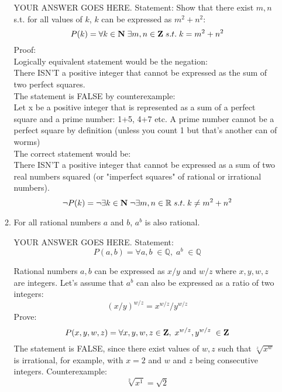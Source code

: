 \documentclass{article}
\begin{document}
\begin{enumerate}
\begin{enumerate}
YOUR ANSWER GOES HERE.
\newline \newline
Statement: 
Show that there exist $m,n$ s.t. for all values of $k$, $k$ can be expressed as $m^2+n^2$:
\[ P(k)= \forall k \in \mbox{{\bfseries N}} \; \exists m,n \in \mbox{{\bfseries Z}} \; s.t. \; k=m^2+n^2 \]
Proof: \\
Logically equivalent statement would be the negation: \\
There ISN'T a positive integer that cannot be expressed as the sum of two perfect squares. \\
The statement is FALSE by counterexample: \\
Let x be a positive integer that is represented as a sum of a perfect square and a prime number: 1+5, 4+7 etc. A prime number cannot be a perfect square by definition (unless you count 1 but that's another can of worms)\\

The correct statement would be:\\
There ISN'T a positive integer that cannot be expressed as a sum of two real numbers squared (or "imperfect squares" of rational or irrational numbers).
\[ \neg P(k)= \neg \exists k \in \mbox{{\bfseries N}} \;  \neg \exists m,n \in \mathbb{R} \; s.t. \; k \ne m^2+n^2 \]
\newpage

\item For all rational numbers $a$ and $b$, $a^b$ is also rational.

YOUR ANSWER GOES HERE.
\newline \newline
Statement: 
\[ P(a,b)= \forall a,b \; \in \mathbb{Q}, \; a^b \; \in \mathbb{Q} \]

Rational numbers $a,b$ can be expressed as $x/y$ and $w/z$ where $x,y,w,z$ are integers. Let's assume that $a^b$ can also be expressed as a ratio of two integers:\\
\[ (x/y)^{w/z}=x^{w/z}/y^{w/z} \]
Prove: 
\[ P(x,y,w,z)= \forall x,y,w,z \in \mbox{{\bfseries Z}}, \; x^{w/z}, y^{w/z} \; \in \mbox{{\bfseries Z}}\]
The statement is FALSE, since there exist values of $w,z$ such that $\sqrt[z]{x^w}$ is irrational, for example, with $x=2$ and $w$ and $z$ being consecutive integers. Counterexample: 
\[ \sqrt[2]{x^1} = \sqrt{2}\]
\end{enumerate}
\end{enumerate}
\end{document}
